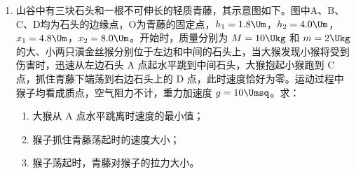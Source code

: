 \documentclass[\gkver]{gaokaozhenti}
\begin{document}
\begin{enumerate}
{\begin{enumerate}
\end{enumerate}

}

\item
山谷中有三块石头和一根不可伸长的轻质青藤，其示意图如下。图中A、B、C、D均为石头的边缘点，O为青藤的固定点，$h_{1}=1.8\Um$，$h_{2}=4.0\Um$，$x_{1}=4.8\Um$，$x_{2}=8.0\Um$。开始时，质量分别为 $M=10\Ukg$ 和 $m=2\Ukg$ 的大、小两只滇金丝猴分别位于左边和中间的石头上，当大猴发现小猴将受到伤害时，迅速从左边石头 A 点起水平跳到中间石头，大猴抱起小猴跑到 C 点，抓住青藤下端荡到右边石头上的 D 点，此时速度恰好为零。运动过程中猴子均看成质点，空气阻力不计，重力加速度 $g=10\Umsq$。求：
\begin{enumerate}
	\item
	大猴从 A 点水平跳离时速度的最小值；
	\item
	猴子抓住青藤荡起时的速度大小；
	\item
	猴子荡起时，青藤对猴子的拉力大小。
\end{enumerate}


\end{enumerate}
\end{document}
